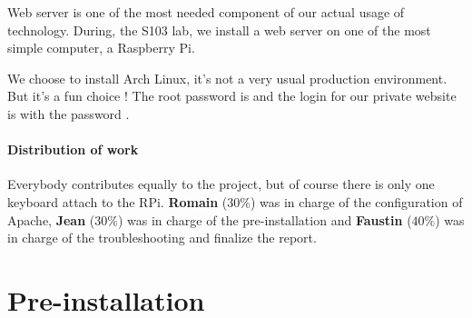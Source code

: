 \documentclass[11pt]{article}
\begin{document}
\restoregeometry %
\nopagecolor%

\pagestyle{fancy}
\fancyhf{}
{
\hypersetup{linkcolor=black}
\tableofcontents
}
\newpage

Web server is one of the most needed component of our actual usage of technology. During, the S103 lab, we install a web server on one of the most simple computer, a Raspberry Pi. 

We choose to install Arch Linux, it's not a very usual production environment. But it's a fun choice ! The root password is  and the login for our private website is  with the password .

\subsection{Distribution of work}

Everybody contributes equally to the project, but of course there is only one keyboard attach to the RPi. \textbf{Romain} ($30\%$) was in charge of the configuration of Apache, \textbf{Jean} ($30\%$) was in charge of the pre-installation and \textbf{Faustin} ($40\%$) was in charge of the troubleshooting and finalize the report.
\part{Pre-installation}
\setcounter{section}{0}
\end{document}
